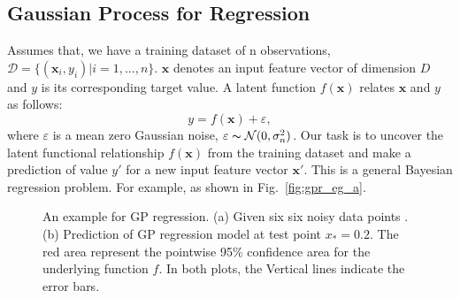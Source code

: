 \subsection{Gaussian Process for Regression}
\label{bg:gpr}
Assumes that, we have a training dataset of n observations, $\mathcal{D}=\{(\mathbf{x}_i,y_i)| i=1,...,n\}$. $\mathbf{x}$ denotes an input feature vector of dimension $D$ and $y$ is its corresponding target value. A latent function $f(\mathbf{x})$ relates $\mathbf{x}$ and $y$ as follows:
\begin{equation}
	y = f(\mathbf{x})+\varepsilon,
\end{equation}
where $\varepsilon$ is a mean zero Gaussian noise, $\varepsilon \thicksim \mathcal{N}(0,\sigma_n^2)$. Our task is to uncover the latent functional relationship $f(\mathbf{x})$ from the training dataset and make a prediction of value $y'$ for a new input feature vector $\mathbf{x}'$. This is a general Bayesian regression problem. For example, as shown in Fig.~\ref{fig:gpr_eg_a}.

\begin{figure}
	\centering
	\hspace{1cm}
	\caption[An example for GP regression]
	{An example for GP regression. (a) Given six six noisy data points . (b) Prediction of GP regression model at test point $x_*=0.2$. The red area represent the pointwise 95\% confidence area for the underlying function $f$. In both plots, the Vertical lines indicate the error bars.}
\end{figure}

